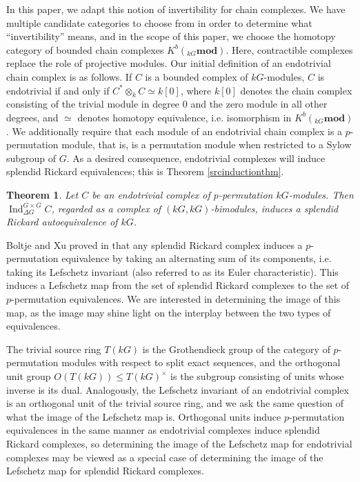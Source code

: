 \documentclass[10pt,letterpaper, boxed, cm]{amsart}
\newcommand{\Ind}{\operatorname{Ind}}
\newcommand{\catmod}{\mathbf{mod}}
\newtheorem{theorem}{Theorem}[section]
\theoremstyle{remark}
\theoremstyle{definition}
\begin{document}
	In this paper, we adapt this notion of invertibility for chain complexes. We have multiple candidate categories to choose from in order to determine what ``invertibility'' means, and in the scope of this paper, we choose the homotopy category of bounded chain complexes $K^b({}_{kG}\mathbf{mod})$. Here, contractible complexes replace the role of projective modules. Our initial definition of an endotrivial chain complex is as follows. If $C$ is a bounded complex of $kG$-modules, $C$ is endotrivial if and only if $C^* \otimes_k C \simeq k[0]$, where $k[0]$ denotes the chain complex consisting of the trivial module in degree 0 and the zero module in all other degrees, and $\simeq$ denotes homotopy equivalence, i.e. isomorphism in $K^b({}_{kG}\catmod)$. We additionally require that each module of an endotrivial chain complex is a $p$-permutation module, that is, is a permutation module when restricted to a Sylow subgroup of $G$. As a desired consequence, endotrivial complexes will induce splendid Rickard equivalences; this is Theorem \ref{srcinductionthm}.

	\begin{theorem}
		Let $C$ be an endotrivial complex of $p$-permutation $kG$-modules. Then $\Ind^{G\times G}_{\Delta G} C$, regarded as a complex of $(kG,kG)$-bimodules, induces a splendid Rickard autoequivalence of $kG$.
	\end{theorem}

	Boltje and Xu proved in \cite[Theorem 1.5]{BX07} that any splendid Rickard complex induces a $p$-permutation equivalence by taking an alternating sum of its components, i.e. taking its Lefschetz invariant (also referred to as its Euler characteristic). This induces a Lefschetz map from the set of splendid Rickard complexes to the set of $p$-permutation equivalences. We are interested in determining the image of this map, as the image may shine light on the interplay between the two types of equivalences.

	The trivial source ring $T(kG)$ is the Grothendieck group of the category of $p$-permutation modules with respect to split exact sequences, and the orthogonal unit group $O(T(kG))\leq T(kG)^\times$ is the subgroup consisting of units whose inverse is its dual. Analogously, the Lefschetz invariant of an endotrivial complex is an orthogonal unit of the trivial source ring, and we ask the same question of what the image of the Lefschetz map is. Orthogonal units induce $p$-permutation equivalences in the same manner as endotrivial complexes induce splendid Rickard complexes, so determining the image of the Lefschetz map for endotrivial complexes may be viewed as a special case of determining the image of the Lefschetz map for splendid Rickard complexes.
\end{document}
